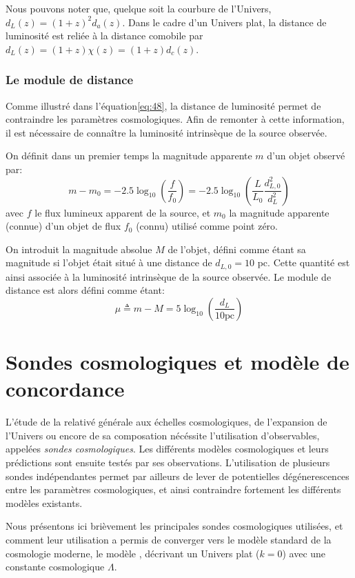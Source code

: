 \documentclass[../main/main.tex]{subfiles}
\begin{document}
Nous pouvons noter que, quelque soit la courbure de l'Univers,
$d_{L}(z)=(1+z)^{2}d_{a}(z)$. Dans le cadre d'un Univers plat, la
distance de luminosité est reliée à la distance comobile par
$d_{L}(z)=(1+z)\chi(z)=(1+z)d_{c}(z)$.

\subsubsection*{Le module de distance}
Comme illustré dans l'équation\ref{eq:48}, la distance de luminosité
permet de contraindre les paramètres cosmologiques. Afin de remonter à
cette information, il est nécessaire de connaître la luminosité
intrinsèque de la source observée.

On définit dans un premier temps la magnitude apparente $m$ d'un objet
observé par:
\begin{equation}
  \label{eq:magapp}
  m-m_{0}=-2.5\log_{10}\left(\frac{f}{f_{0}}\right) = -2.5\log_{10}\left(\frac{L}{L_{0}}\frac{d_{L,0}^{2}}{d_{L}^{2}}\right)
\end{equation}
avec $f$ le flux lumineux apparent de la source, et $m_{0}$ la magnitude
apparente (connue) d'un objet de flux $f_{0}$ (connu) utilisé comme
point zéro.

On introduit la magnitude absolue $M$ de l'objet, défini comme étant
sa magnitude si l'objet était situé à une distance de $d_{L,0}=10$
pc. Cette quantité est ainsi associée à la luminosité intrinsèque de la
source observée. Le module de distance est alors défini comme étant:
\begin{equation}
  \label{eq:distmodulemu}
  \mu\triangleq m-M=5\log_{10}\left(\frac{d_{L}}{10\text{pc}}\right)
\end{equation}
\section{Sondes cosmologiques et modèle de concordance \lcdm}\label{ssec:LCDM}

L'étude de la relativé générale aux échelles cosmologiques, de
l'expansion de l'Univers ou encore de sa composation nécéssite
l'utilisation d'observables, appelées \textit{sondes cosmologiques}.
Les différents modèles cosmologiques et leurs prédictions sont ensuite
testés par ses observations. L'utilisation de plusieurs sondes
indépendantes permet
par ailleurs de lever de potentielles dégénerescences entre les paramètres
cosmologiques, et ainsi contraindre fortement les différents modèles
existants.

Nous présentons ici brièvement les principales sondes cosmologiques
utilisées, et comment leur utilisation a permis de converger vers le
modèle standard de la cosmologie moderne, le modèle \lcdm, décrivant un
Univers plat ($k=0$) avec une constante cosmologique $\Lambda$.
\end{document}
